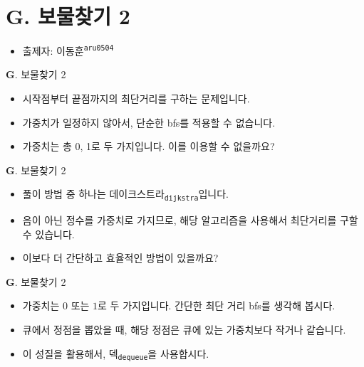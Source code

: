 \section{G. 보물찾기 2}

\begin{frame} %
    \begin{itemize}
        \item 출제자: 이동훈\textsuperscript{\color{kupc-gray}\texttt{aru0504}}
    \end{itemize}
\end{frame}

\begin{frame}{\textbf{G}. 보물찾기 2}
	\begin{itemize}
		\item 시작점부터 끝점까지의 최단거리를 구하는 문제입니다.
		\item 가중치가 일정하지 않아서, 단순한 bfs를 적용할 수 없습니다.
		\item 가중치는 총 0, 1로 두 가지입니다. 이를 이용할 수 없을까요?
	\end{itemize}
	
\end{frame}

\begin{frame}{\textbf{G}. 보물찾기 2}
	\begin{itemize}
		\item 풀이 방법 중 하나는 데이크스트라\textsubscript{\texttt{\color{kupc-gray}dijkstra}}입니다.
		\item 음이 아닌 정수를 가중치로 가지므로, 해당 알고리즘을 사용해서 최단거리를 구할 수 있습니다.
		\item 이보다 더 간단하고 효율적인 방법이 있을까요?
	\end{itemize}
\end{frame}

\begin{frame}{\textbf{G}. 보물찾기 2}
	\begin{itemize}
		\item 가중치는 $0$ 또는 $1$로 두 가지입니다. 간단한 최단 거리 bfs를 생각해 봅시다.
		\item 큐에서 정점을 뽑았을 때, 해당 정점은 큐에 있는 가중치보다 작거나 같습니다.
		\item 이 성질을 활용해서, 덱\textsubscript{\texttt{\color{kupc-gray}dequeue}}을 사용합시다.
	\end{itemize}
\end{frame}

